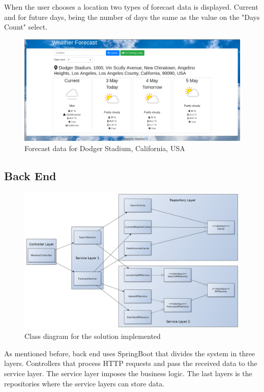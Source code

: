 \documentclass[12pt]{article}
\begin{document}
When the user chooses a location two types of forecast data is displayed. Current and for
  future days, being the number of days the same as the value on the "Days Count" select.

\begin{figure}[h]
  \center
  \includegraphics[scale=0.35]{forecast_data_website.png}
  \caption{Forecast data for Dodger Stadium, California, USA}
\end{figure}

\subsection{Back End}

\begin{figure}[h]
  \center
  \includegraphics[scale=0.35]{solution.png}
  \caption{Class diagram for the solution implemented}
  \label{fig_class_diagram}
\end{figure}

As mentioned before, back end uses SpringBoot that divides the system in three layers. Controllers
  that process HTTP requests and pass the received data to the service layer. The service layer
  imposes the business logic. The last layers is the repositories where the service layers can store
  data.
\end{document}

